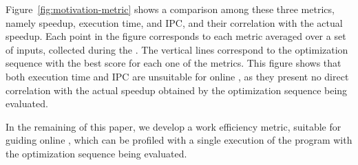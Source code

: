 Figure~\ref{fig:motivation-metric} shows a comparison among these three metrics,
namely speedup, execution time, and IPC, and their correlation with the actual
speedup.
Each point in the figure corresponds to each metric averaged over 
a set of inputs, collected during the {\itercomp}.
The vertical lines correspond to the optimization sequence 
with the best score for each one of the metrics.
This figure shows that both execution time and IPC are unsuitable for
online {\itercomp}, as they present no direct correlation with the actual
speedup obtained by the optimization sequence being evaluated.

In the remaining of this paper, we develop a work efficiency metric, suitable
for guiding online {\itercomp}, which can be profiled with a single execution
of the program with the optimization sequence being evaluated.

